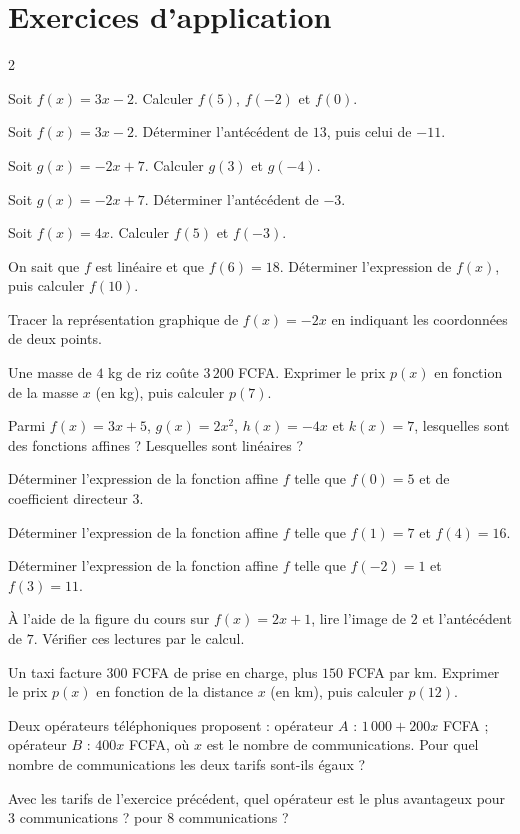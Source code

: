 \section{Exercices d'application}
\begin{multicols}{2}

\exo{} Soit $f(x)=3x-2$. Calculer $f(5)$, $f(-2)$ et $f(0)$.

\exo{} Soit $f(x)=3x-2$. Déterminer l'antécédent de $13$, puis celui de $-11$.

\exo{} Soit $g(x)=-2x+7$. Calculer $g(3)$ et $g(-4)$.

\exo{} Soit $g(x)=-2x+7$. Déterminer l'antécédent de $-3$.

\exo{} Soit $f(x)=4x$. Calculer $f(5)$ et $f(-3)$.

\exo{} On sait que $f$ est linéaire et que $f(6)=18$. Déterminer l'expression de
$f(x)$, puis calculer $f(10)$.

\exo{} Tracer la représentation graphique de $f(x)=-2x$ en indiquant les
coordonnées de deux points.

\exo{} Une masse de $4$ kg de riz coûte $3\,200$ FCFA. Exprimer le prix $p(x)$ en
fonction de la masse $x$ (en kg), puis calculer $p(7)$.

\exo{} Parmi $f(x)=3x+5$, $g(x)=2x^{2}$, $h(x)=-4x$ et $k(x)=7$, lesquelles sont des
fonctions affines ? Lesquelles sont linéaires ?

\exo{} Déterminer l'expression de la fonction affine $f$ telle que $f(0)=5$ et de
coefficient directeur $3$.

\exo{} Déterminer l'expression de la fonction affine $f$ telle que $f(1)=7$ et
$f(4)=16$.

\exo{} Déterminer l'expression de la fonction affine $f$ telle que $f(-2)=1$ et
$f(3)=11$.

\exo{} À l'aide de la figure du cours sur $f(x)=2x+1$, lire l'image de $2$ et
l'antécédent de $7$. Vérifier ces lectures par le calcul.

\exo{} Un taxi facture $300$ FCFA de prise en charge, plus $150$ FCFA par km.
Exprimer le prix $p(x)$ en fonction de la distance $x$ (en km), puis calculer $p(12)$.

\exo{} Deux opérateurs téléphoniques proposent : opérateur $A$ : $1\,000+200x$
FCFA ; opérateur $B$ : $400x$ FCFA, où $x$ est le nombre de communications. Pour quel
nombre de communications les deux tarifs sont-ils égaux ?

\exo{} Avec les tarifs de l'exercice précédent, quel opérateur est le plus
avantageux pour $3$ communications ? pour $8$ communications ?

\end{multicols}

